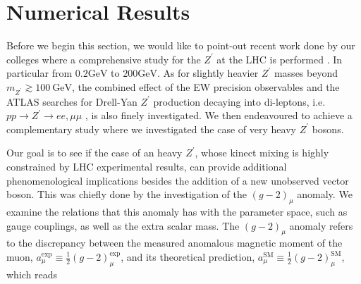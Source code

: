 


\section{Numerical Results}

Before we begin this section, we would like to point-out recent work done by our colleges where a comprehensive study for the $Z^\prime$ at the LHC is performed \cite{Deppisch:2019ldi}. 
%
In particular from $0.2 \mathrm{GeV}$ to $200 \mathrm{GeV}$. As for slightly heavier $Z^\prime$ masses beyond $m_{Z^\prime} \gtrsim 100~\mathrm{GeV}$, the combined effect of the EW precision observables and the ATLAS searches for Drell-Yan $Z^\prime$ production decaying into di-leptons, i.e.~$pp \to Z^\prime \to ee,\mu \mu$ \cite{Aaboud:2017buh}, is also finely investigated.
%
We then endeavoured to achieve a complementary study where we investigated the case of very heavy $Z^\prime$ bosons. 

Our goal is to see if the case of an heavy $Z^\prime$, whose kinect mixing is highly constrained by LHC experimental results, can provide additional phenomenological implications besides the addition of a new unobserved vector boson.
This was chiefly done by the investigation of the $\left(g-2\right)_\mu$ anomaly. 
%
%
We examine the relations that this anomaly has with the parameter space, such as gauge couplings, as well as the extra scalar mass. The $\left( g-2 \right)_\mu$ anomaly refers to the discrepancy between the measured anomalous magnetic moment of the muon, $a_\mu^{\mathrm{\text{exp}}} \equiv \tfrac{1}{2} \left( g-2 \right)^{\mathrm{\text{exp}}}_\mu$, and its theoretical prediction, $a_\mu^{\mathrm{SM}} \equiv \tfrac{1}{2} \left(g-2\right)^{\mathrm{SM}}_\mu$, which reads \cite{Tanabashi:2018oca}

